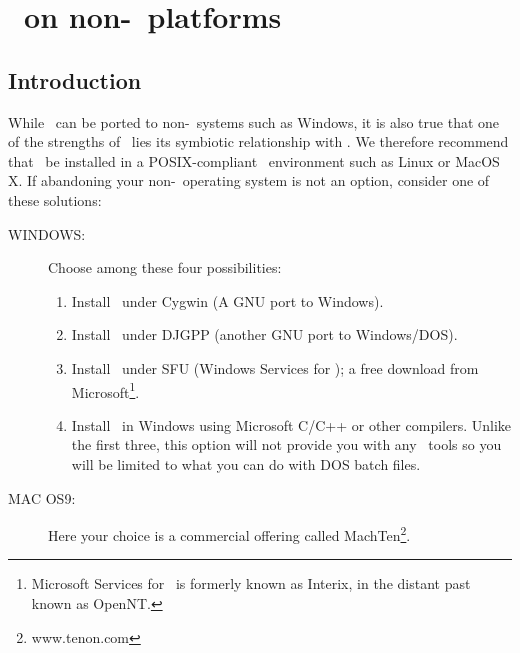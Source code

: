 %
%
\chapter{\gmt\ on non-\UNIX\ platforms}
\thispagestyle{headings}

\section{Introduction}

While \GMT\ can be ported to non-\UNIX\ systems such as
Windows, it is also true that one of the
strengths of \GMT\ lies its symbiotic relationship with
\UNIX.  We therefore recommend that \GMT\ be installed in
a POSIX-compliant \UNIX\ environment such as Linux
or MacOS X.  If abandoning your non-\UNIX\ operating system
is not an option, consider one of these solutions:

\begin{description}
\item [WINDOWS:] Choose among these four possibilities:

\begin{enumerate}

\item Install \GMT\ under Cygwin (A GNU port to Windows). 

\item Install \GMT\ under DJGPP (another GNU port to Windows/DOS).

\item Install \GMT\ under SFU (Windows Services for \UNIX); a free download from
Microsoft\footnote{Microsoft Services for \UNIX\ is formerly known as Interix, in the distant past known as OpenNT.}.

\item Install \GMT\ in Windows using Microsoft C/C++ or other
compilers.  Unlike the first three, this option will not provide you with any
\UNIX\ tools so you will be limited to what you can do with
DOS batch files.


\end{enumerate}

\item [MAC OS9:] Here your choice is a commercial offering called MachTen\footnote{www.tenon.com}.
\end{description}

